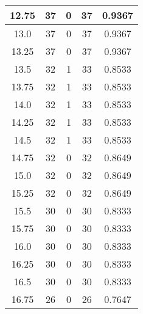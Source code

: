 \documentclass[letterpaper, 12pt]{article}
\begin{document}
\begin{longtable}{|c|c|c|c|c|}
\hline
12.75 & 37 & 0 & 37 & 0.9367 \\
\hline
13.0 & 37 & 0 & 37 & 0.9367 \\
\hline
13.25 & 37 & 0 & 37 & 0.9367 \\
\hline
13.5 & 32 & 1 & 33 & 0.8533 \\
\hline
13.75 & 32 & 1 & 33 & 0.8533 \\
\hline
14.0 & 32 & 1 & 33 & 0.8533 \\
\hline
14.25 & 32 & 1 & 33 & 0.8533 \\
\hline
14.5 & 32 & 1 & 33 & 0.8533 \\
\hline
14.75 & 32 & 0 & 32 & 0.8649 \\
\hline
15.0 & 32 & 0 & 32 & 0.8649 \\
\hline
15.25 & 32 & 0 & 32 & 0.8649 \\
\hline
15.5 & 30 & 0 & 30 & 0.8333 \\
\hline
15.75 & 30 & 0 & 30 & 0.8333 \\
\hline
16.0 & 30 & 0 & 30 & 0.8333 \\
\hline
16.25 & 30 & 0 & 30 & 0.8333 \\
\hline
16.5 & 30 & 0 & 30 & 0.8333 \\
\hline
16.75 & 26 & 0 & 26 & 0.7647 \\
\hline
\end{longtable}
\end{document}
